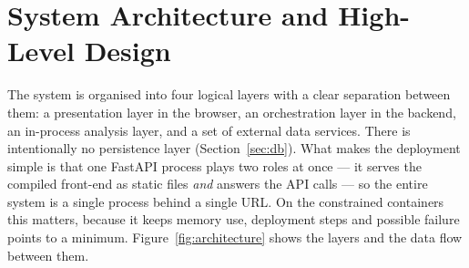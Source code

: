 \documentclass[manuscript,screen]{acmart}
\begin{document}
\section{System Architecture and High-Level Design}
\label{sec:architecture}
The system is organised into four logical layers with a clear separation between
them: a presentation layer in the browser, an orchestration layer in the backend,
an in-process analysis layer, and a set of external data services. There is
intentionally no persistence layer (Section~\ref{sec:db}). What makes the
deployment simple is that one FastAPI process plays two roles at once --- it serves
the compiled front-end as static files \emph{and} answers the API calls --- so the
entire system is a single process behind a single URL. On the constrained
containers this matters, because it keeps memory use, deployment steps and possible
failure points to a minimum. Figure~\ref{fig:architecture} shows the layers and the
data flow between them.
\end{document}
